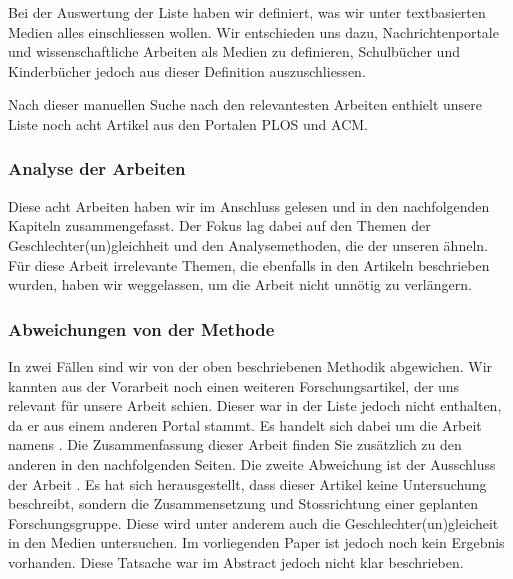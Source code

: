 Bei der Auswertung der Liste haben wir definiert, was wir unter textbasierten Medien alles einschliessen wollen.
Wir entschieden uns dazu, Nachrichtenportale und wissenschaftliche Arbeiten als Medien zu definieren, Schulbücher
und Kinderbücher jedoch aus dieser Definition auszuschliessen.

Nach dieser manuellen Suche nach den relevantesten Arbeiten enthielt unsere Liste noch acht Artikel aus den Portalen PLOS und ACM.

\subsubsection{Analyse der Arbeiten}
Diese acht Arbeiten haben wir im Anschluss gelesen und in den nachfolgenden Kapiteln zusammengefasst. Der Fokus lag
dabei auf den Themen der Geschlechter(un)gleichheit und den Analysemethoden, die der unseren ähneln. Für diese Arbeit irrelevante
Themen, die ebenfalls in den Artikeln beschrieben wurden, haben wir weggelassen, um die Arbeit nicht unnötig zu verlängern.

\subsubsection{Abweichungen von der Methode}
In zwei Fällen sind wir von der oben beschriebenen Methodik abgewichen. Wir kannten aus der Vorarbeit noch einen
weiteren Forschungsartikel, der uns relevant für unsere Arbeit schien. Dieser war in der Liste jedoch nicht enthalten, da er aus einem
anderen Portal stammt. Es handelt sich dabei um die Arbeit namens  \cite{gender_bias_in_media}.
Die Zusammenfassung dieser Arbeit finden Sie zusätzlich zu den anderen in den nachfolgenden Seiten. Die zweite Abweichung
ist der Ausschluss der Arbeit  \cite{iet-minoritized-communities}. Es hat sich herausgestellt,
dass dieser Artikel keine Untersuchung beschreibt, sondern die Zusammensetzung und Stossrichtung einer geplanten Forschungsgruppe.
Diese wird unter anderem auch die Geschlechter(un)gleicheit in den Medien untersuchen. Im vorliegenden Paper ist jedoch noch kein
Ergebnis vorhanden. Diese Tatsache war im Abstract jedoch nicht klar beschrieben.